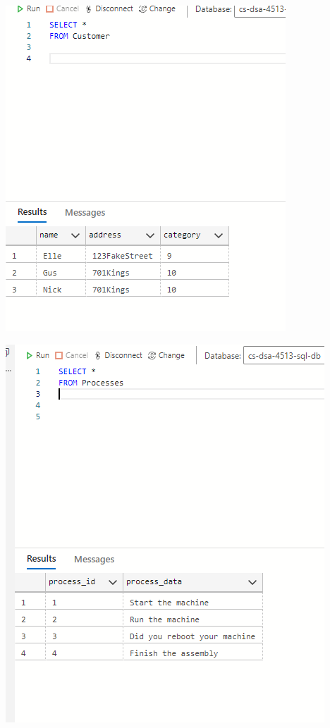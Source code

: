 \documentclass[11pt]{article}
\begin{document}
\includegraphics[width = \textwidth]{custTable.png}

\includegraphics[width = \textwidth]{processTable.png}
\end{document}
